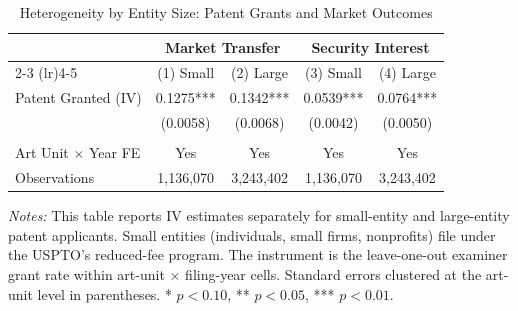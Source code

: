 \begin{table}[H]
\centering
\caption{Heterogeneity by Entity Size: Patent Grants and Market Outcomes}
\label{tab:heterogeneity}
\begin{threeparttable}
\begin{tabular}{lcccc}
\toprule
 & \multicolumn{2}{c}{Market Transfer} & \multicolumn{2}{c}{Security Interest} \\
\cmidrule(lr){2-3} \cmidrule(lr){4-5}
 & (1) Small & (2) Large & (3) Small & (4) Large \\
\midrule
Patent Granted (IV) & 0.1275*** & 0.1342*** & 0.0539*** & 0.0764*** \\
 & (0.0058) & (0.0068) & (0.0042) & (0.0050) \\
\\
Art Unit $\times$ Year FE & Yes & Yes & Yes & Yes \\
Observations & 1,136,070 & 3,243,402 & 1,136,070 & 3,243,402 \\
\bottomrule
\end{tabular}
\begin{tablenotes}[flushleft]
\small
\item \textit{Notes:} This table reports IV estimates separately for small-entity and large-entity patent applicants. Small entities (individuals, small firms, nonprofits) file under the USPTO's reduced-fee program. The instrument is the leave-one-out examiner grant rate within art-unit $\times$ filing-year cells. Standard errors clustered at the art-unit level in parentheses. * $p<0.10$, ** $p<0.05$, *** $p<0.01$.
\end{tablenotes}
\end{threeparttable}
\end{table}
